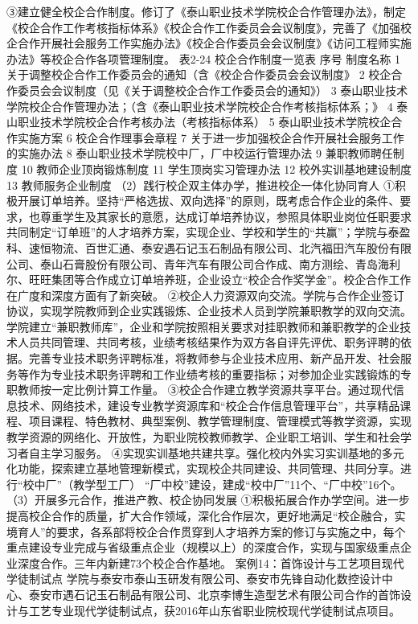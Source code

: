 ③建立健全校企合作制度。修订了《泰山职业技术学院校企合作管理办法》，制定《校企合作工作考核指标体系》《校企合作工作委员会会议制度》，完善了《加强校企合作开展社会服务工作实施办法》《校企合作委员会会议制度》《访问工程师实施办法》等校企合作各项管理制度。
表2-24 校企合作制度一览表
序号
制度名称
1
关于调整校企合作工作委员会的通知（含《校企合作委员会会议制度》
2
校企合作委员会会议制度（见《关于调整校企合作工作委员会的通知》）
3
泰山职业技术学院校企合作管理办法；（含《泰山职业技术学院校企合作考核指标体系；》
4
泰山职业技术学院校企合作考核办法（考核指标体系）
5
泰山职业技术学院校企合作实施方案
6
校企合作理事会章程
7
关于进一步加强校企合作开展社会服务工作的实施办法
8
泰山职业技术学院校中厂，厂中校运行管理办法
9
兼职教师聘任制度
10
教师企业顶岗锻炼制度
11
学生顶岗实习管理办法
12
校外实训基地建设制度
13
教师服务企业制度
（2）践行校企双主体办学，推进校企一体化协同育人
①积极开展订单培养。坚持“严格选拔、双向选择”的原则，既考虑合作企业的条件、要求，也尊重学生及其家长的意愿，达成订单培养协议，参照具体职业岗位任职要求共同制定“订单班”的人才培养方案，实现企业、学校和学生的“共赢”；学院与泰盈科、速恒物流、百世汇通、泰安遇石记玉石制品有限公司、北汽福田汽车股份有限公司、泰山石膏股份有限公司、青年汽车有限公司合作成、南方测绘、青岛海利尔、旺旺集团等合作成立订单培养班，企业设立“校企合作奖学金”。校企合作工作在广度和深度方面有了新突破。
②校企人力资源双向交流。学院与合作企业签订协议，实现学院教师到企业实践锻炼、企业技术人员到学院兼职教学的双向交流。学院建立“兼职教师库”，企业和学院按照相关要求对挂职教师和兼职教学的企业技术人员共同管理、共同考核，业绩考核结果作为双方各自评先评优、职务评聘的依据。完善专业技术职务评聘标准，将教师参与企业技术应用、新产品开发、社会服务等作为专业技术职务评聘和工作业绩考核的重要指标；对参加企业实践锻炼的专职教师按一定比例计算工作量。
③校企合作建立教学资源共享平台。通过现代信息技术、网络技术，建设专业教学资源库和“校企合作信息管理平台”，共享精品课程、项目课程、特色教材、典型案例、教学管理制度、管理模式等教学资源，实现教学资源的网络化、开放性，为职业院校教师教学、企业职工培训、学生和社会学习者自主学习服务。
④实现实训基地共建共享。强化校内外实习实训基地的多元化功能，探索建立基地管理新模式，实现校企共同建设、共同管理、共同分享。进行“校中厂”（教学型工厂） “厂中校”建设，建成“校中厂”11个、“厂中校”16个。
（3）开展多元合作，推进产教、校企协同发展
①积极拓展合作办学空间。进一步提高校企合作的质量，扩大合作领域，深化合作层次，更好地满足“校企融合，实境育人”的要求，各系部将校企合作贯穿到人才培养方案的修订与实施之中，每个重点建设专业完成与省级重点企业（规模以上）的深度合作，实现与国家级重点企业深度合作。三年内新建73个校企合作基地。
案例14：首饰设计与工艺项目现代学徒制试点
学院与泰安市泰山玉研发有限公司、泰安市先锋自动化数控设计中心、泰安市遇石记玉石制品有限公司、北京李博生造型艺术有限公司合作的首饰设计与工艺专业现代学徒制试点，获2016年山东省职业院校现代学徒制试点项目。
